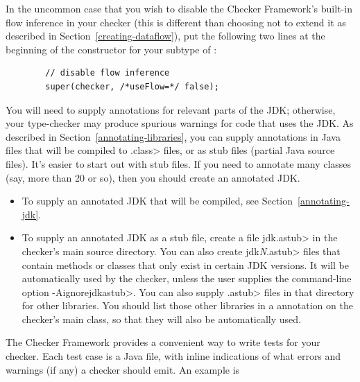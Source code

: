 
In the uncommon case that you wish to disable the Checker Framework's
built-in flow inference in your checker (this is different than choosing
not to extend it as described in Section~\ref{creating-dataflow}), put the
following two lines at the beginning of the constructor for your subtype of
:

\begin{Verbatim}
        // disable flow inference
        super(checker, /*useFlow=*/ false);
\end{Verbatim}



You will need to supply annotations for relevant parts of the JDK;
otherwise, your type-checker may produce spurious warnings for code that
uses the JDK\@.  As described in Section~\ref{annotating-libraries}, you can
supply annotations in Java files that will be compiled to \<.class> files,
or as stub files (partial Java source files).
It's easier to start out with stub files.  If you need to annotate many
classes (say, more than 20 or so), then you should create an annotated JDK.

\begin{itemize}
\item
To supply an annotated JDK that will be compiled, see Section~\ref{annotating-jdk}.
\item
To supply an annotated JDK as a stub file, create a file \<jdk.astub> in
the checker's main source directory.  You can also create \<jdk\emph{N}.astub> files that contain methods
or classes that only exist in certain JDK versions.
It will be automatically used by the
checker, unless the user supplies the command-line option \<-Aignorejdkastub>.
You can also supply \<.astub> files in that directory for other libraries.
You should list those other libraries in a
 annotation on the checker's main
class, so that they will also be automatically used.
\end{itemize}



The Checker Framework provides a convenient way to write tests for your
checker.  Each test case is a Java file, with inline indications of what
errors and warnings (if any) a checker should emit.  An example is


